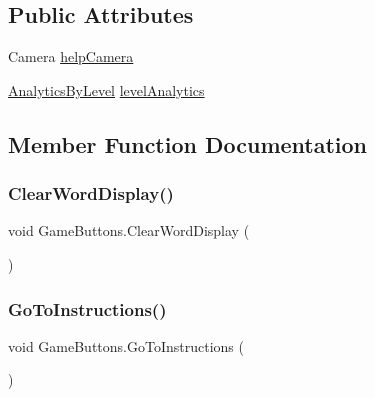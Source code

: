 \subsection*{Public Attributes}
\begin{DoxyCompactItemize}
\item 
Camera \hyperlink{class_game_buttons_a2209c4c549e16c9c815b1c0a3a15bbbd}{help\+Camera}
\item 
\hyperlink{class_analytics_by_level}{Analytics\+By\+Level} \hyperlink{class_game_buttons_a1d1a3181b45c9bd292fa2490acb742c2}{level\+Analytics}
\end{DoxyCompactItemize}


\subsection{Member Function Documentation}
\mbox{\label{class_game_buttons_aa55857210a186acda2b262d2cab348b8}} 
\subsubsection{\texorpdfstring{Clear\+Word\+Display()}{ClearWordDisplay()}}
{\footnotesize\ttfamily void Game\+Buttons.\+Clear\+Word\+Display (\begin{DoxyParamCaption}{ }\end{DoxyParamCaption})}

\mbox{\label{class_game_buttons_ac91982c8a1409e977ceb47220fd7112a}} 
\subsubsection{\texorpdfstring{Go\+To\+Instructions()}{GoToInstructions()}}
{\footnotesize\ttfamily void Game\+Buttons.\+Go\+To\+Instructions (\begin{DoxyParamCaption}{ }\end{DoxyParamCaption})}

\mbox{\label{class_game_buttons_a53eb5843078798e6617647ae83bfbc1e}} 
